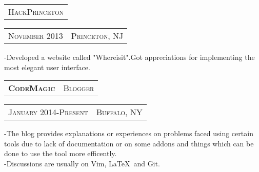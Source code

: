 \documentclass[10pt,letterpaper,oneside]{article}
\begin{document}
    \begin{tabular}{c}
        {\small H\textsc{ack}P\textsc{rinceton}}
    \end{tabular}
    \hspace{4.6in}
    \textcolor{light-gray}{
        \begin{tabular}{c|c}
            {\small N\textsc{ovember 2013}}
            &{\small P\textsc{rinceton}, NJ}
        \end{tabular}
    }
    \vspace{-12pt}
    \begin{adjustwidth}{7pt}{0pt}
        {\footnotesize -Developed a website called "Whereisit".Got appreciations for implementing  the
        most elegant user interface.}\\
    \end{adjustwidth}
    \vspace{-8pt}
    \begin{tabular}{c|c}
        \textbf{\normalsize C\textsc{ode}M\textsc{agic}}
        &\textmd{\normalsize B\textsc{logger}}
    \end{tabular}
    \hspace{3.8in}
    \textcolor{light-gray}{
        \begin{tabular}{c|c}
            {\small J\textsc{anuary 2014}-P\textsc{resent}}
            &{\small B\textsc{uffalo}, NY}
        \end{tabular}
    } 
    \vspace{-4mm}
    \begin{adjustwidth}{7pt}{0pt}
        {\footnotesize -The blog provides explanations or experiences on problems faced using certain tools due to lack
        of documentation or on some addons and things which can be done to use the tool more efficently.}\\
        {\footnotesize -Discussions are usually on Vim, \LaTeX \  and Git. }
    \end{adjustwidth}
    \vspace{10pt}
    \begin{comment}
        \begin{tabular}{c}
        \textbf{\normalsize A\textsc{ffiliations}}\\
        \end{tabular}
        \begin{adjustwidth}{7pt}{0pt}
            {\footnotesize \textbf{International Society of Technical Education(09-12)} -Participated in several events and
            organised a few events.}\\
            {\footnotesize \textbf{Computer Society of India(09-12)} -Member since 2009,organised few workshops and
        tutorial sessions.}
            \vspace{0pt}\\
        \end{adjustwidth} 
    \end{comment}
\end{document}

